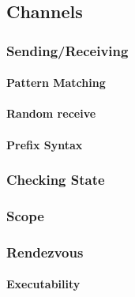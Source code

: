 \documentclass[a4paper, 11pt, accentcolor = tud3b]{tudreport}
\begin{document}
            \subsection{Channels} %

                \subsubsection{Sending/Receiving} %

                    \paragraph{Pattern Matching} %

                    \paragraph{Random receive} %

                    \paragraph{Prefix Syntax} %

                \subsubsection{Checking State} %

                \subsubsection{Scope} %

                \subsubsection{Rendezvous} %

                    \paragraph{Executability} %
\end{document}
